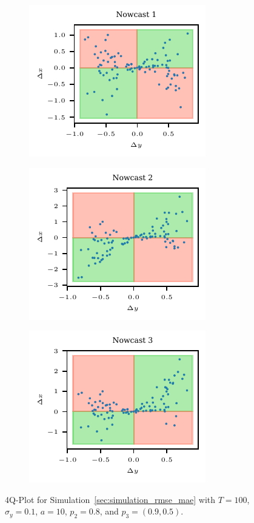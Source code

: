 \documentclass[oneside]{article}
\theoremstyle{plain}%
\theoremstyle{definition}
\begin{document}
\begin{figure}
  \centering
  \begin{subfigure}{.32\textwidth}
  	\includegraphics{plots/simulation_same_rmse_mae/4q_plot_1}
  \end{subfigure}
  \begin{subfigure}{.32\textwidth}
  	\includegraphics{plots/simulation_same_rmse_mae/4q_plot_2}
  \end{subfigure}
    \begin{subfigure}{.32\textwidth}
  	\includegraphics{plots/simulation_same_rmse_mae/4q_plot_3}
  \end{subfigure}
  \caption{4Q-Plot for Simulation~\ref{sec:simulation_rmse_mae} with $T = 100$, $\sigma_y=0.1$, $a = 10$, $p_2 = 0.8$, and $p_3 = (0.9, 0.5)$.}
  \label{fig:simulation_rmse_mae_4q}
\end{figure}
\end{document}
